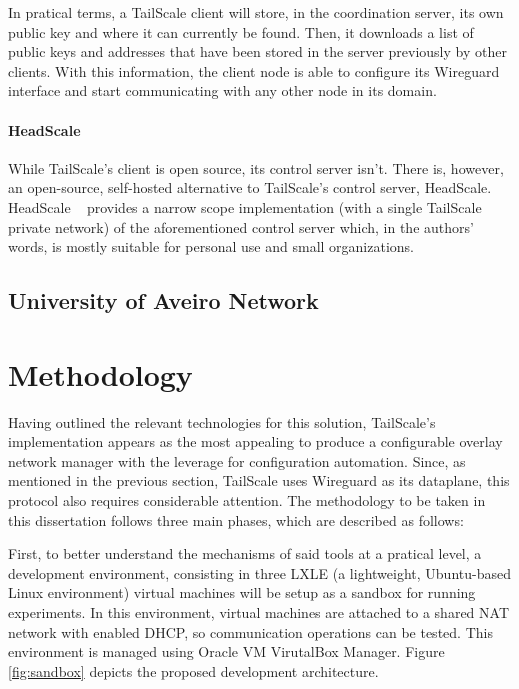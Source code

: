 \documentclass[11pt,twoside,a4paper]{report}
\begin{document}
In pratical terms, a TailScale client will store, in the coordination server, its own public key and where it can currently be found. Then, it downloads a list of public keys and addresses that have been stored in the server previously by other clients. With this information, the client node is able to configure its Wireguard interface and start communicating with any other node in its domain.


\subsubsection{HeadScale}

While TailScale's client is open source, its control server isn't. There is, however, an open-source, self-hosted alternative to TailScale's control server, HeadScale. HeadScale ~\cite{headscale2023online} provides a narrow scope implementation (with a single TailScale private network) of the aforementioned control server which, in the authors' words, is mostly suitable for personal use and small organizations.


\section{University of Aveiro Network}

\chapter{Methodology}
\label{chapter:method}

Having outlined the relevant technologies for this solution, TailScale's implementation appears as the most appealing to produce a configurable overlay network manager with the leverage for configuration automation. Since, as mentioned in the previous section, TailScale uses Wireguard as its dataplane, this protocol also requires considerable attention. The methodology to be taken in this dissertation follows three main phases, which are described as follows:

First, to better understand the mechanisms of said tools at a pratical level, a development environment, consisting in three LXLE (a lightweight, Ubuntu-based Linux environment) virtual machines will be setup as a sandbox for running experiments. In this environment, virtual machines are attached to a shared NAT network with enabled DHCP, so communication operations can be tested. This environment is managed using Oracle VM VirutalBox Manager. Figure \ref{fig:sandbox} depicts the proposed development architecture.
\end{document}
